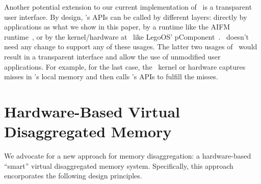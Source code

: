 Another potential extension to our current implementation of \sys\ is a transparent user interface.
By design, \sys’s APIs can be called by different layers: directly by applications as what we show in this paper, by a runtime like the AIFM runtime~\cite{AIFM}, or by the kernel/hardware at \CN\ like LegoOS' pComponent~\cite{Shan18-OSDI}. \sysboard\ doesn’t need any change to support any of these usages.
The latter two usages of \sysboard\ would result in a transparent interface and allow the use of unmodified user applications.
For example, for the last case, the \CN\ kernel or hardware captures misses in \CN’s local memory and then calls \sys’s APIs to fulfill the misses.

\fi






\section{Hardware-Based Virtual Disaggregated Memory}
\label{sec:vdm}

We advocate for a new approach for memory disaggregation:
a hardware-based ``smart'' virtual disaggregated memory system.
Specifically, this approach encorporates the following design principles.

